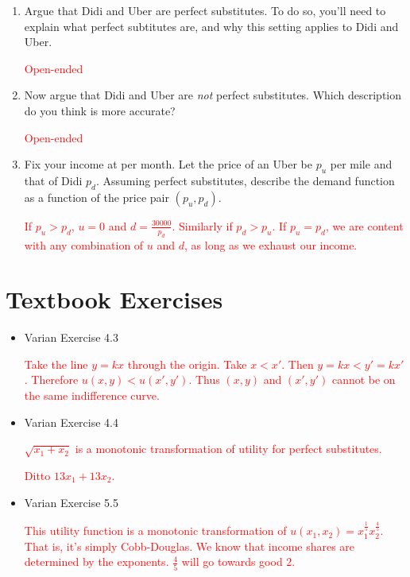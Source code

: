 \documentclass{article}
\begin{document}
\begin{enumerate}
\item Argue that Didi and Uber are perfect substitutes. To do so, you'll need to explain what perfect subtitutes are, and why this setting applies to Didi and Uber.

\textcolor{red}{Open-ended}

\item Now argue that Didi and Uber are \textit{not} perfect substitutes. Which description do you think is more accurate? 

\textcolor{red}{Open-ended}

\item Fix your income at  per month. Let the price of an Uber be $p_u$ per mile and that of Didi $p_d$. Assuming perfect substitutes, describe the demand function as a function of the price pair $(p_u, p_d)$.

\textcolor{red}{%
If $p_u > p_d$, $u = 0$ and $d = \frac{30000}{p_d}$. Similarly if $p_d > p_u$. If $p_u = p_d$, we are content with any combination of $u$ and $d$, as long as we exhaust our income.%
}
\end{enumerate}

\section{Textbook Exercises}

\begin{itemize}

\item Varian Exercise 4.3

\textcolor{red}{%
Take the line $y = kx$ through the origin. Take $x < x'$. Then $y = kx < y' = kx'$. Therefore $u(x,y) < u(x', y')$. Thus $(x,y)$ and $(x', y')$ cannot be on the same indifference curve.%
}

\item Varian Exercise 4.4


\textcolor{red}{%
$\sqrt{x_1 + x_2}$ is a monotonic transformation of utility for perfect substitutes.%
}

\textcolor{red}{%
Ditto $13x_1 + 13x_2$.%
}

\item Varian Exercise 5.5

\textcolor{red}{%
This utility function is a monotonic transformation of $u(x_1, x_2) = x_1^{\frac15}x_2^{\frac45}$. That is, it's simply Cobb-Douglas. We know that income shares are determined by the exponents. $\frac45$ will go towards good 2.%
}

\end{itemize}
\end{document}
